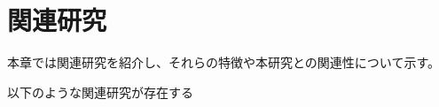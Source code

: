 \chapter{関連研究}
\label{chap:kanren}

本章では関連研究を紹介し、それらの特徴や本研究との関連性について示す。

\newpage

以下のような関連研究が存在する\cite{online}\cite{learning}